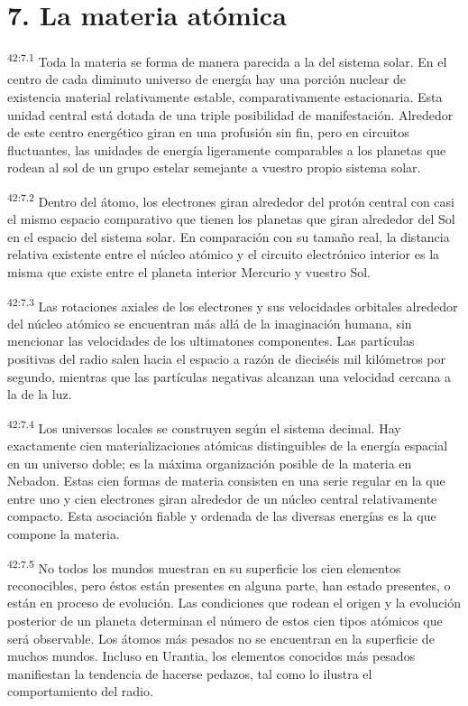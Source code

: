 \section*{7. La materia atómica}
\par
\textsuperscript{42:7.1} Toda la materia se forma de manera parecida a la del sistema solar. En el centro de cada diminuto universo de energía hay una porción nuclear de existencia material relativamente estable, comparativamente estacionaria. Esta unidad central está dotada de una triple posibilidad de manifestación. Alrededor de este centro energético giran en una profusión sin fin, pero en circuitos fluctuantes, las unidades de energía ligeramente comparables a los planetas que rodean al sol de un grupo estelar semejante a vuestro propio sistema solar.

\par
\textsuperscript{42:7.2} Dentro del átomo, los electrones giran alrededor del protón central con casi el mismo espacio comparativo que tienen los planetas que giran alrededor del Sol en el espacio del sistema solar. En comparación con su tamaño real, la distancia relativa existente entre el núcleo atómico y el circuito electrónico interior es la misma que existe entre el planeta interior Mercurio y vuestro Sol.

\par
\textsuperscript{42:7.3} Las rotaciones axiales de los electrones y sus velocidades orbitales alrededor del núcleo atómico se encuentran más allá de la imaginación humana, sin mencionar las velocidades de los ultimatones componentes. Las partículas positivas del radio salen hacia el espacio a razón de dieciséis mil kilómetros por segundo, mientras que las partículas negativas alcanzan una velocidad cercana a la de la luz.

\par
\textsuperscript{42:7.4} Los universos locales se construyen según el sistema decimal. Hay exactamente cien materializaciones atómicas distinguibles de la energía espacial en un universo doble; es la máxima organización posible de la materia en Nebadon. Estas cien formas de materia consisten en una serie regular en la que entre uno y cien electrones giran alrededor de un núcleo central relativamente compacto. Esta asociación fiable y ordenada de las diversas energías es la que compone la materia.

\par
\textsuperscript{42:7.5} No todos los mundos muestran en su superficie los cien elementos reconocibles, pero éstos están presentes en alguna parte, han estado presentes, o están en proceso de evolución. Las condiciones que rodean el origen y la evolución posterior de un planeta determinan el número de estos cien tipos atómicos que será observable. Los átomos más pesados no se encuentran en la superficie de muchos mundos. Incluso en Urantia, los elementos conocidos más pesados manifiestan la tendencia de hacerse pedazos, tal como lo ilustra el comportamiento del radio.


